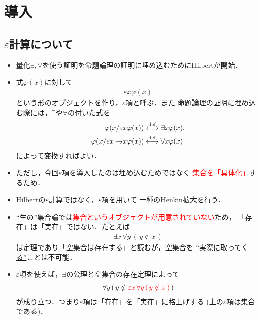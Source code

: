 \section{導入}
\subsection{$\varepsilon$計算について}
	\begin{itemize}
	\setlength{\itemsep}{10pt}
		\item 量化$\exists,\forall$を使う証明を命題論理の証明に埋め込むためにHilbertが開始．
		
		\item 式$\varphi(x)$に対して
			\begin{align}
				\varepsilon x \varphi(x)
			\end{align}
			という形のオブジェクトを作り，$\varepsilon$項と呼ぶ．また
			命題論理の証明に埋め込む際には，$\exists$や$\forall$の付いた式を
			\begin{align}
				\varphi(x/\varepsilon x \varphi(x)) &\overset{\mathrm{def}}{\longleftrightarrow} \exists x \varphi(x), \\
				\varphi(x/\varepsilon x \rightharpoondown\hspace{-0.25em} x \varphi(x)) &\overset{\mathrm{def}}{\longleftrightarrow} \forall x \varphi(x)
			\end{align}
			によって変換すればよい．
			
		\item ただし，今回$\varepsilon$項を導入したのは埋め込むためではなく
			\textcolor{red}{集合を「具体化」}するため．
			
		\item Hilbertの$\varepsilon$計算ではなく，$\varepsilon$項を用いて
			一種のHenkin拡大を行う．
	\end{itemize}
	
\newpage
	\begin{itemize}
	\setlength{\itemsep}{10pt}
		\item ``生の''集合論では\textcolor{red}{集合というオブジェクトが用意されていない}ため，
			「存在」は「実在」ではない．たとえば
			\begin{align}
				\exists x\, \forall y\, (\, y \notin x\, )
			\end{align}
			は定理であり「空集合は存在する」と読むが，空集合を
			\underline{``実際に取ってくる''}ことは不可能．
			
		\item $\varepsilon$項を使えば，$\exists$の公理と空集合の存在定理によって
			\begin{align}
				\forall y\, (\, y \notin \color{red}{\varepsilon x\, \forall y\, (\, y \notin x\, )}\, \color{black}{)}
			\end{align}
			が成り立つ．つまり$\varepsilon$項は「存在」を「実在」に格上げする
			(上の$\varepsilon$項は集合である)．
	\end{itemize}
	
